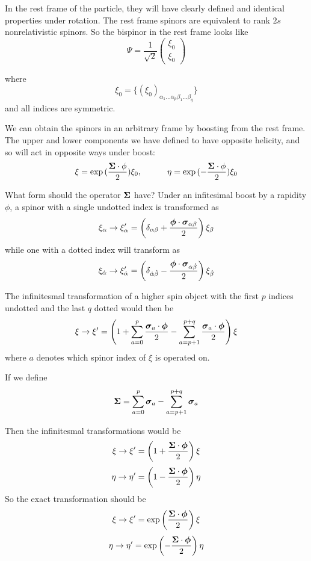 In the rest frame of the particle, they will have clearly defined and identical properties under rotation.    The rest frame spinors are equivalent to rank $2s$ nonrelativistic spinors.  So the bispinor in the rest frame looks like
\[
\Psi = \frac{1}{\sqrt{2}} \begin{pmatrix} \xi_0 \\ \xi_0 \end{pmatrix}
\]

where
\[
	\xi_0 = \{ (\xi_0)_{\alpha_1 \ldots \alpha_p \beta_1 \ldots \beta_q}  \}
\]
and all indices are symmetric.

We can obtain the spinors in an arbitrary frame by boosting from the rest frame.  The upper and lower components we have defined to have opposite helicity, and so will act in opposite ways under boost:
\[
	\xi = \exp{(\frac{\ensuremath{\mathbf{\Sigma}} \cdot \ensuremath{\mathbf{\phi}}}{2}) } \xi_0,  
	\hspace{3em} 
	\eta = \exp{(-\frac{\ensuremath{\mathbf{\Sigma}} \cdot \ensuremath{\mathbf{\phi}}}{2}) } \xi_0
\]

What form should the operator $\mathbf{\Sigma}$ have?  Under an infitesimal boost by a rapidity $\phi$, a spinor with a single undotted index is transformed as
\[
	\xi_\alpha \to \xi'_\alpha = \left(\delta_{\alpha \beta} + \frac{\mbox{\boldmath$ \phi $}\cdot \mbox{\boldmath$ \sigma $}_{\alpha \beta} }{2} \right) \xi_\beta 
\]
while one with a dotted index will transform as
\[
\xi_{\dot\alpha} \to \xi'_{\dot\alpha} = \left(\delta_{\dot \alpha \dot \beta} - \frac{\mbox{\boldmath$ \phi $}\cdot \mbox{\boldmath$ \sigma $}_{\dot \alpha \dot\beta} }{2} \right) \xi_{\dot \beta}
\]


The infinitesmal transformation of a higher spin object with the first $p$ indices undotted and the last $q$ dotted would then be
\[
	\xi \to \xi' = \left(1 
		+  \sum\limits_{a=0}^p \frac{\mbox{\boldmath$ \sigma $}_a \cdot \mbox{\boldmath$ \phi $} }{2}
		- \sum\limits_{a=p+1}^{p+q} \frac{\mbox{\boldmath$ \sigma $}_a \cdot \mbox{\boldmath$ \phi $} }{2}
	\right ) \xi 
\]
where $a$ denotes which spinor index of $\xi$ is operated on.


If we define 
\[
	\mathbf{\Sigma} = \sum\limits_{a=0}^p \mbox{\boldmath$ \sigma $}_a - \sum\limits_{a=p+1}^{p+q} \mbox{\boldmath$ \sigma $}_a 
\]

Then the infinitesmal transformations would be
\[
	\xi \to \xi' = \left( 1 + \frac{\mbox{\boldmath$ \Sigma $} \cdot \mbox{\boldmath$ \phi $} }{2} \right) \xi
\]
\[
	\eta \to \eta' = \left( 1 - \frac{\mbox{\boldmath$ \Sigma $} \cdot \mbox{\boldmath$ \phi $} }{2} \right) \eta
\]
So the exact transformation should be
\[
		\xi \to \xi' = \exp\left( \frac{\mbox{\boldmath$ \Sigma $} \cdot \mbox{\boldmath$ \phi $} }{2} \right) \xi
\]
\[
	\eta \to \eta' = \exp \left( -\frac{\mbox{\boldmath$ \Sigma $} \cdot \mbox{\boldmath$ \phi $} }{2} \right) \eta
\]  
  
